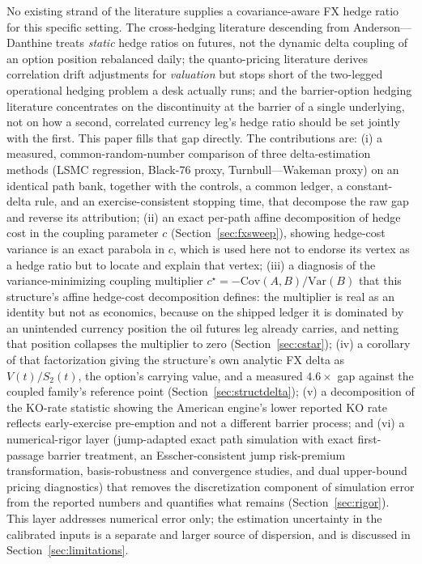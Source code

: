 \documentclass[11pt,a4paper]{article}
\begin{document}
No existing strand of the literature supplies a covariance-aware FX hedge ratio for this specific setting. The cross-hedging literature descending from Anderson---Danthine treats \emph{static} hedge ratios on futures, not the dynamic delta coupling of an option position rebalanced daily; the quanto-pricing literature derives correlation drift adjustments for \emph{valuation} but stops short of the two-legged operational hedging problem a desk actually runs; and the barrier-option hedging literature concentrates on the discontinuity at the barrier of a single underlying, not on how a second, correlated currency leg's hedge ratio should be set jointly with the first. This paper fills that gap directly. The contributions are: (i) a measured, common-random-number comparison of three delta-estimation methods (LSMC regression, Black-76 proxy, Turnbull---Wakeman proxy) on an identical path bank, together with the controls, a common ledger, a constant-delta rule, and an exercise-consistent stopping time, that decompose the raw gap and reverse its attribution; (ii) an exact per-path affine decomposition of hedge cost in the coupling parameter $c$ (Section~\ref{sec:fxsweep}), showing hedge-cost variance is an exact parabola in $c$, which is used here not to endorse its vertex as a hedge ratio but to locate and explain that vertex; (iii) a diagnosis of the variance-minimizing coupling multiplier $c^\star=-\mathrm{Cov}(A,B)/\mathrm{Var}(B)$ that this structure's affine hedge-cost decomposition defines: the multiplier is real as an identity but not as economics, because on the shipped ledger it is dominated by an unintended currency position the oil futures leg already carries, and netting that position collapses the multiplier to zero (Section~\ref{sec:cstar}); (iv) a corollary of that factorization giving the structure's own analytic FX delta as $V(t)/S_2(t)$, the option's carrying value, and a measured $4.6\times$ gap against the coupled family's reference point (Section~\ref{sec:structdelta}); (v) a decomposition of the KO-rate statistic showing the American engine's lower reported KO rate reflects early-exercise pre-emption and not a different barrier process; and (vi) a numerical-rigor layer (jump-adapted exact path simulation with exact first-passage barrier treatment, an Esscher-consistent jump risk-premium transformation, basis-robustness and convergence studies, and dual upper-bound pricing diagnostics) that removes the discretization component of simulation error from the reported numbers and quantifies what remains (Section~\ref{sec:rigor}). This layer addresses numerical error only; the estimation uncertainty in the calibrated inputs is a separate and larger source of dispersion, and is discussed in Section~\ref{sec:limitations}.
\end{document}
